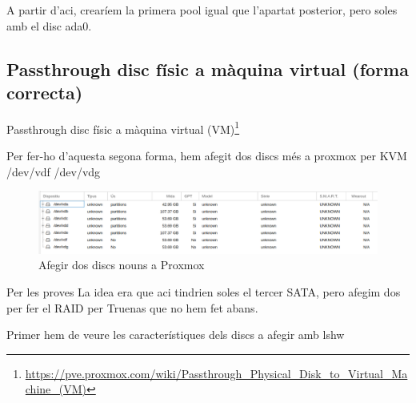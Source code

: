 \documentclass[
  10pt,
]{krantz}
\DeclareRobustCommand{\href}[2]{#2\footnote{\url{#1}}}
\begin{document}
\begin{rmdinfo}{}
A partir d'aci, crearíem la primera pool igual que l'apartat posterior, pero soles amb el disc ada0.

\end{rmdinfo}

\hypertarget{passthrough-disc-fuxedsic-a-muxe0quina-virtual-forma-correcta}{%
\subsection{Passthrough disc físic a màquina virtual (forma correcta)}\label{passthrough-disc-fuxedsic-a-muxe0quina-virtual-forma-correcta}}

\href{https://pve.proxmox.com/wiki/Passthrough_Physical_Disk_to_Virtual_Machine_(VM)}{Passthrough disc físic a màquina virtual (VM)}

Per fer-ho d'aquesta segona forma, hem afegit dos discs més a proxmox per KVM /dev/vdf /dev/vdg

\begin{figure}
\centering
\includegraphics{imatges/proxmox/Afegir_passtrhough.png}
\caption{Afegir dos discs nouns a Proxmox}
\end{figure}

\begin{rmdinfo}{Per les proves}
La idea era que aci tindrien soles el tercer SATA, pero afegim dos per fer el RAID per Truenas que no hem fet abans.

\end{rmdinfo}

Primer hem de veure les característiques dels discs a afegir amb lshw
\end{document}
